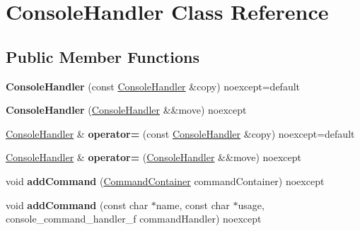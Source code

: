 \hypertarget{class_console_handler}{}\section{Console\+Handler Class Reference}
\label{class_console_handler}
\subsection*{Public Member Functions}
\begin{DoxyCompactItemize}
\item 
\mbox{\label{class_console_handler_abbd7a4978ca1ea24363084c9894c95fd}} 
{\bfseries Console\+Handler} (const \mbox{\hyperlink{class_console_handler}{Console\+Handler}} \&copy) noexcept=default
\item 
\mbox{\label{class_console_handler_aa57064abfe4aba62d1b4dfe84cb026c4}} 
{\bfseries Console\+Handler} (\mbox{\hyperlink{class_console_handler}{Console\+Handler}} \&\&move) noexcept
\item 
\mbox{\label{class_console_handler_ac5c196431e012b7cfd8804a738e063df}} 
\mbox{\hyperlink{class_console_handler}{Console\+Handler}} \& {\bfseries operator=} (const \mbox{\hyperlink{class_console_handler}{Console\+Handler}} \&copy) noexcept=default
\item 
\mbox{\label{class_console_handler_a9ac4a8bfe834a72999b6df275f0ddb28}} 
\mbox{\hyperlink{class_console_handler}{Console\+Handler}} \& {\bfseries operator=} (\mbox{\hyperlink{class_console_handler}{Console\+Handler}} \&\&move) noexcept
\item 
\mbox{\label{class_console_handler_afe055c69b6ce1f1b6546f733c740821e}} 
void {\bfseries add\+Command} (\mbox{\hyperlink{struct_command_container}{Command\+Container}} command\+Container) noexcept
\item 
\mbox{\label{class_console_handler_a6095ec0c7e1604cc994f6aa6a546f4ef}} 
void {\bfseries add\+Command} (const char $\ast$name, const char $\ast$usage, console\+\_\+command\+\_\+handler\+\_\+f command\+Handler) noexcept
\item 
\mbox{\label{class_console_handler_a220c51f8504d06fb0012181a3c9fd4a9}} 

\end{DoxyCompactItemize}

